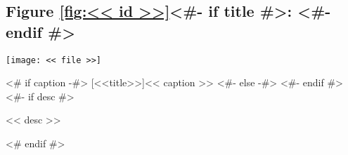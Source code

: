 \begin{samepage}
\subsection{Figure \ref{fig:<< id >>}<#- if title #>: <#- endif #>\hfill%
  \color{light-gray}}
\nopagebreak
\noindent\centerline{\texttt{[image: << file >>]}}
<# if caption -#>
\nopagebreak
{}[<<title>>]{<< caption >>}
<#- else -#>
<#- endif #>\label{fig:<< id >>}
<#- if desc #>
\nopagebreak
\begin{figinfo}<< desc >>\end{figinfo}
<# endif #>
\end{samepage}
\vspace{20pt}
